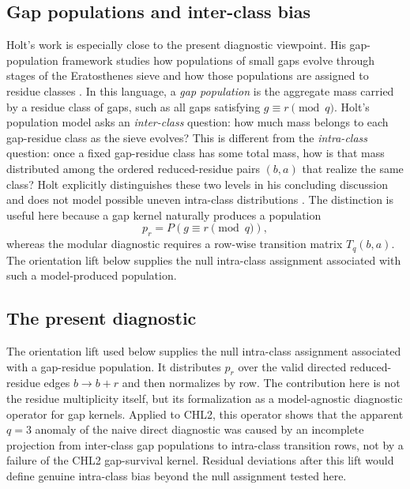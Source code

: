 \documentclass[10pt]{article}
\begin{document}
\subsection{Gap populations and inter-class bias}
Holt's work is especially close to the present diagnostic viewpoint.  His gap-population framework studies how populations of small gaps evolve through stages of the Eratosthenes sieve and how those populations are assigned to residue classes \cite{holt2016,holt2024}.  In this language, a \emph{gap population} is the aggregate mass carried by a residue class of gaps, such as all gaps satisfying $g\equiv r\pmod q$.  Holt's population model asks an \emph{inter-class} question: how much mass belongs to each gap-residue class as the sieve evolves?  This is different from the \emph{intra-class} question: once a fixed gap-residue class has some total mass, how is that mass distributed among the ordered reduced-residue pairs $(b,a)$ that realize the same class?  Holt explicitly distinguishes these two levels in his concluding discussion and does not model possible uneven intra-class distributions \cite{holt2024}.  The distinction is useful here because a gap kernel naturally produces a population
\[
p_r=P(g\equiv r\pmod q),
\]
whereas the modular diagnostic requires a row-wise transition matrix $T_q(b,a)$.  The orientation lift below supplies the null intra-class assignment associated with such a model-produced population.

\subsection{The present diagnostic}
The orientation lift used below supplies the null intra-class assignment associated with a gap-residue population.  It distributes $p_r$ over the valid directed reduced-residue edges $b\to b+r$ and then normalizes by row.  The contribution here is not the residue multiplicity itself, but its formalization as a model-agnostic diagnostic operator for gap kernels.  Applied to CHL2, this operator shows that the apparent $q=3$ anomaly of the naive direct diagnostic was caused by an incomplete projection from inter-class gap populations to intra-class transition rows, not by a failure of the CHL2 gap-survival kernel.  Residual deviations after this lift would define genuine intra-class bias beyond the null assignment tested here.
\end{document}
